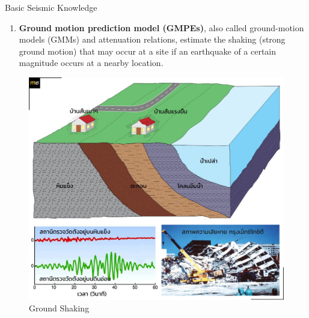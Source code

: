 \documentclass{beamer}
\newcounter{saveenumi}
\newcommand{\seti}{\setcounter{saveenumi}{\value{enumi}}}
\newcommand{\conti}{\setcounter{enumi}{\value{saveenumi}}}
\begin{document}
	\begin{frame}[t]{Basic Seismic Knowledge}
		\begin{enumerate}
			\conti
			\item \textbf{Ground motion prediction model (GMPEs)}, also called ground-motion models 
			(GMMs) and attenuation relations, estimate the shaking (strong ground motion) that may occur 
			at a site if an earthquake of a certain magnitude occurs at a nearby location.
			\seti
		\end{enumerate}
		
		\begin{figure}
			\centering
			\includegraphics[scale=0.5]{shak.jpg}
			\caption{Ground Shaking}
		\end{figure}
	\end{frame}
	
\end{document}
